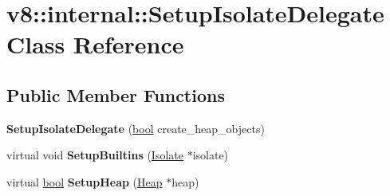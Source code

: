 \hypertarget{classv8_1_1internal_1_1SetupIsolateDelegate}{}\section{v8\+:\+:internal\+:\+:Setup\+Isolate\+Delegate Class Reference}
\label{classv8_1_1internal_1_1SetupIsolateDelegate}
\subsection*{Public Member Functions}
\begin{DoxyCompactItemize}
\item 
\mbox{\label{classv8_1_1internal_1_1SetupIsolateDelegate_a56bbf332b0c051e3882b74b802b6f037}} 
{\bfseries Setup\+Isolate\+Delegate} (\mbox{\hyperlink{classbool}{bool}} create\+\_\+heap\+\_\+objects)
\item 
\mbox{\label{classv8_1_1internal_1_1SetupIsolateDelegate_ab92859a5a77d7aae7b73266d708dbf11}} 
virtual void {\bfseries Setup\+Builtins} (\mbox{\hyperlink{classv8_1_1internal_1_1Isolate}{Isolate}} $\ast$isolate)
\item 
\mbox{\label{classv8_1_1internal_1_1SetupIsolateDelegate_ad26aeb76f2a57176e21b09d978704e9d}} 
virtual \mbox{\hyperlink{classbool}{bool}} {\bfseries Setup\+Heap} (\mbox{\hyperlink{classv8_1_1internal_1_1Heap}{Heap}} $\ast$heap)
\end{DoxyCompactItemize}
